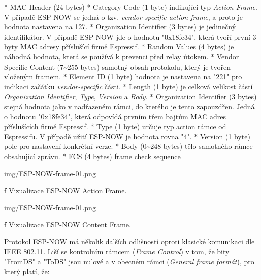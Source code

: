 \begitems
* {\sbf MAC Header} (24 bytes)
* {\sbf Category Code} (1 byte) indikující typ {\em Action Frame}. V případě ESP-NOW se jedná o tzv. {\em vendor-specific action frame}, a proto je hodnota nastavena na 127.
* {\sbf Organization Identifier} (3 bytes) je jedinečný identifikátor. V případě ESP-NOW jde o hodnotu "0x18fe34", která tvoří první 3 byty MAC adresy příslušící firmě Espressif.
* {\sbf Random Values} (4 bytes) je náhodná hodnota, která se používá k prevenci před relay útokem.
* {\sbf Vendor Specific Content} (7{\sim}255 bytes) samotný obsah protokolu, který je tvořen vloženým framem.
    \begitems
    * {\sbf Element ID} (1 byte) hodnota je nastavena na "221" pro indikaci začátku {\em vendor-specific} části.
    * {\sbf Length} (1 byte) je celková velikost částí {\em Organization Identifier}, {\em Type}, {\em Version} a {\em Body}.
    * {\sbf Organization Identifier} (3 bytes) stejná hodnota jako v nadřazeném rámci, do kterého je tento zapouzdřen. Jedná o hodnotu "0x18fe34", která odpovídá prvním třem bajtům MAC adres příslušících firmě Espressif.
    * {\sbf Type} (1 byte) určuje typ action rámce od Espressifu. V případě užití ESP-NOW je hodnota rovna "4".
    * {\sbf Version} (1 byte) pole pro nastavení konkrétní verze.
    * {\sbf Body} (0{\sim}248 bytes) tělo samotného rámce obsahující zprávu.
    \enditems
* {\sbf FCS} (4 bytes) frame check sequence
\enditems

\medskip
{}
\picw=14cm \cinspic img/ESP-NOW-frame-01.png
\caption/f Vizualizace ESP-NOW Action Frame.
\medskip

\medskip
{}
\picw=14cm \cinspic img/ESP-NOW-frame-01.png
\caption/f Vizualizace ESP-NOW Content Frame.
\medskip

Protokol ESP-NOW má několik dalších odlišností oproti klasické komunikaci dle IEEE 802.11. Liší se kontrolním rámcem ({\em Frame Control}) v tom, že bity "FromDS" a "ToDS" jsou nulové a v obecném rámci ({\em General frame formát}), pro který platí, že:

